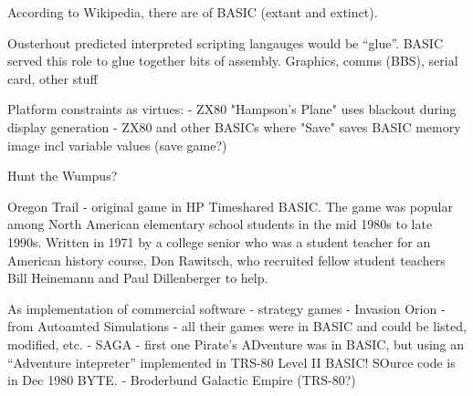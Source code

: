 According to Wikipedia,
there are  of BASIC
(extant and extinct).



Ousterhout predicted interpreted scripting langauges would be ``glue''.
BASIC served this role to glue together bits of assembly.  Graphics,
comms (BBS), serial card, other stuff


Platform constraints as virtues:
 - ZX80 "Hampson's Plane" uses blackout during display generation 
 - ZX80 and other BASICs where "Save" saves BASIC memory image incl
 variable values (save game?)




Hunt the Wumpus?


Oregon Trail - original game in HP Timeshared BASIC.  The game was popular among
North American elementary school students in the mid 1980s to late
1990s.  Written  in 1971 by a college senior who was a student teacher for an
American history course, Don Rawitsch, who recruited fellow student
teachers Bill Heinemann and Paul Dillenberger to help.

As implementation of commercial software - strategy games
  - Invasion Orion - from Autoamted Simulations - all their games were
  in BASIC and could be listed, modified, etc.
  - SAGA - first one Pirate's ADventure was in BASIC, but using an
  ``Adventure intepreter'' implemented in TRS-80 Level II BASIC!  SOurce
  code is in Dec 1980 BYTE.
  - Broderbund Galactic Empire (TRS-80?)

